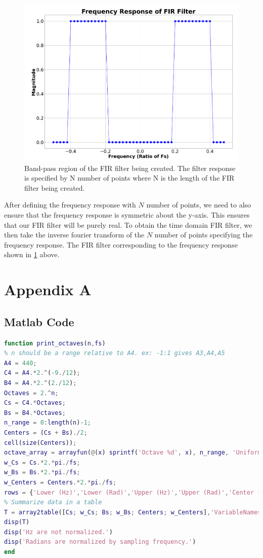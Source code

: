 \documentclass[a4paper, 11pt]{exam}
\begin{document}
\newpage
\begin{figure}[h!]
  \centering
  \hspace*{-1.5cm}\includegraphics[width=17cm]{../images/define_freqs.png}
  \caption{Band-pass region of the FIR filter being created. The filter response is specified by N number of points where N is the length of the FIR filter being created.}
  \label{fig:define_freqs}
\end{figure}

After defining the frequency response with $N$ number of points, we need to also ensure that the frequency response is symmetric about the y-axis. This ensures that our FIR filter will be purely real. To obtain the time domain FIR filter, we then take the inverse fourier transform of the $N$ number of points specifying the frequency response. The FIR filter corresponding to the frequency response shown in \ref{fig:define_freqs} above.

\newpage
\section*{Appendix A}
\subsection{Matlab Code}
\begin{lstlisting}[language=Matlab]
function print_octaves(n,fs)
% n should be a range relative to A4. ex: -1:1 gives A3,A4,A5
A4 = 440;
C4 = A4.*2.^(-9./12);
B4 = A4.*2.^(2./12);
Octaves = 2.^n;
Cs = C4.*Octaves;
Bs = B4.*Octaves;
n_range = 0:length(n)-1;
Centers = (Cs + Bs)./2;
cell(size(Centers));
octave_array = arrayfun(@(x) sprintf('Octave %d', x), n_range, 'UniformOutput', false);
w_Cs = Cs.*2.*pi./fs;
w_Bs = Bs.*2.*pi./fs;
w_Centers = Centers.*2.*pi./fs;
rows = {'Lower (Hz)','Lower (Rad)','Upper (Hz)','Upper (Rad)','Center (Hz)','Center (Rad)'};
% Summarize data in a table
T = array2table([Cs; w_Cs; Bs; w_Bs; Centers; w_Centers],'VariableNames',octave_array,'RowName',rows);
disp(T)
disp('Hz are not normalized.')
disp('Radians are normalized by sampling frequency.')
end 
\end{lstlisting}
\end{document}
